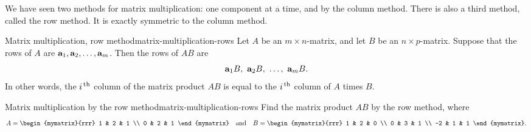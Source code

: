 We have seen two methods for matrix multiplication: one component at a
time, and by the column method. There is also a third method, called
the row method. It is exactly symmetric to the column method.

\begin{proposition}{Matrix multiplication, row method}{matrix-multiplication-rows}
  Let $A$ be an $m\times n$-matrix, and let $B$ be an
  $n\times p$-matrix.  Suppose that the rows of $A$ are
  $\vect{a}_1,\vect{a}_2,\ldots,\vect{a}_m$. Then the rows of $AB$
  are%
  \begin{equation*}
    \vect{a}_1B,~\vect{a}_2B,~\ldots,~\vect{a}_mB.
  \end{equation*}
  In other words, the $i^{\,\rm th}$ column of the matrix product $AB$ is
  equal to the $i^{\,\rm th}$ column of $A$ times $B$.
\end{proposition}

\begin{example}{Matrix multiplication by the row method}{matrix-multiplication-rows}
  Find the matrix product $AB$ by the row method, where
  \begin{equation*}
    A = \begin{mymatrix}{rrr}
      1 & 2 & 1 \\
      0 & 2 & 1
    \end{mymatrix}
    \quad\mbox{and}\quad
    B = \begin{mymatrix}{rrr}
      1 & 2 & 0 \\
      0 & 3 & 1 \\
      -2 & 1 & 1
    \end{mymatrix}.
  \end{equation*}
\end{example}

